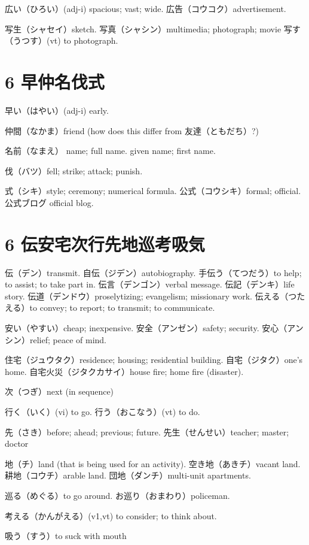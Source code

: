 広い（ひろい）(adj-i) spacious; vast; wide.
広告（コウコク）advertisement.

写生（シャセイ）sketch.
写真（シャシン）multimedia; photograph; movie
写す（うつす）(vt) to photograph.

\section{6 早仲名伐式}

早い（はやい）(adj-i) early.

仲間（なかま）friend (how does this differ from 友達（ともだち）?)

名前（なまえ）
name; full name.
given name; first name.

伐（バツ）fell; strike; attack; punish.

式（シキ）style; ceremony; numerical formula.
公式（コウシキ）formal; official.
公式ブログ official blog.

\section{6 伝安宅次行先地巡考吸気}

伝（デン）transmit.
自伝（ジデン）autobiography.
手伝う（てつだう）to help; to assist; to take part in.
伝言（デンゴン）verbal message.
伝記（デンキ）life story.
伝道（デンドウ）proselytizing; evangelism; missionary work.
伝える（つたえる）to convey; to report; to transmit; to communicate.

安い（やすい）cheap; inexpensive.
安全（アンゼン）safety; security.
安心（アンシン）relief; peace of mind.

住宅（ジュウタク）residence; housing; residential building.
自宅（ジタク）one's home.
自宅火災（ジタクカサイ）house fire; home fire (disaster).

次（つぎ）next (in sequence)

行く（いく）(vi) to go.
行う（おこなう）(vt) to do.

先（さき）before; ahead; previous; future.
先生（せんせい）teacher; master; doctor

地（チ）land (that is being used for an activity).
空き地（あきチ）vacant land.
耕地（コウチ）arable land.
団地（ダンチ）multi-unit apartments.

巡る（めぐる）to go around.
お巡り（おまわり）policeman.

考える（かんがえる）(v1,vt) to consider; to think about.

吸う（すう）to suck with mouth

